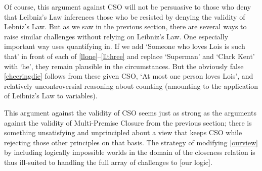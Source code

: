 \documentclass[If.tex]{subfiles}
\begin{document}
Of course, this argument against CSO will not be persuasive to those who deny that Leibniz's Law inferences those who  be resisted by denying the validity of Lebniz's Law.  But as we saw in the previous section, there are several ways to raise similar challenges without relying on Leibniz's Law.  One especially important way uses quantifying in.  If we add ‘Someone who loves Lois is such that’ in front of each of \ref{llone}--\ref{llthree} and replace ‘Superman’ and ‘Clark Kent’ with ‘he’, they remain plausible in the circumstances.  But the obviously false \ref{cheeringdie} follows from these given CSO, ‘At most one person loves Lois’, and relatively uncontroversial reasoning about counting (amounting to the application of Leibniz's Law to variables).  

This argument against the validity of CSO seems just as strong as the arguments against the validity of Multi-Premise Closure from the previous section; there is something unsatisfying and unprincipled about a view that keeps CSO while rejecting those other principles on that basis.  The strategy of modifying \ref{ourview} by including logically impossible worlds in the domain of the closeness relation is thus ill-suited to handling the full array of challenges to [our logic].  
\end{document}
